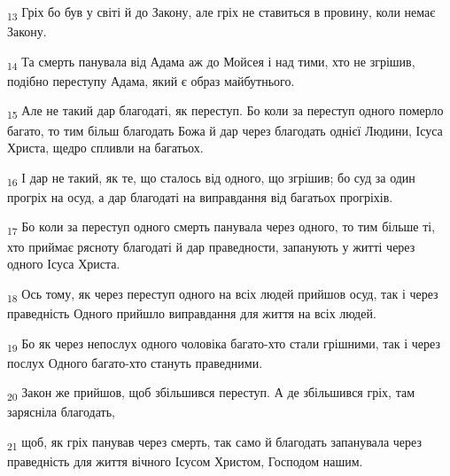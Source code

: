 \begin{tcolorbox}
\textsubscript{13} Гріх бо був у світі й до Закону, але гріх не ставиться в провину, коли немає Закону.
\end{tcolorbox}
\begin{tcolorbox}
\textsubscript{14} Та смерть панувала від Адама аж до Мойсея і над тими, хто не згрішив, подібно переступу Адама, який є образ майбутнього.
\end{tcolorbox}
\begin{tcolorbox}
\textsubscript{15} Але не такий дар благодаті, як переступ. Бо коли за переступ одного померло багато, то тим більш благодать Божа й дар через благодать однієї Людини, Ісуса Христа, щедро спливли на багатьох.
\end{tcolorbox}
\begin{tcolorbox}
\textsubscript{16} І дар не такий, як те, що сталось від одного, що згрішив; бо суд за один прогріх на осуд, а дар благодаті на виправдання від багатьох прогріхів.
\end{tcolorbox}
\begin{tcolorbox}
\textsubscript{17} Бо коли за переступ одного смерть панувала через одного, то тим більше ті, хто приймає рясноту благодаті й дар праведности, запанують у житті через одного Ісуса Христа.
\end{tcolorbox}
\begin{tcolorbox}
\textsubscript{18} Ось тому, як через переступ одного на всіх людей прийшов осуд, так і через праведність Одного прийшло виправдання для життя на всіх людей.
\end{tcolorbox}
\begin{tcolorbox}
\textsubscript{19} Бо як через непослух одного чоловіка багато-хто стали грішними, так і через послух Одного багато-хто стануть праведними.
\end{tcolorbox}
\begin{tcolorbox}
\textsubscript{20} Закон же прийшов, щоб збільшився переступ. А де збільшився гріх, там зарясніла благодать,
\end{tcolorbox}
\begin{tcolorbox}
\textsubscript{21} щоб, як гріх панував через смерть, так само й благодать запанувала через праведність для життя вічного Ісусом Христом, Господом нашим.
\end{tcolorbox}
